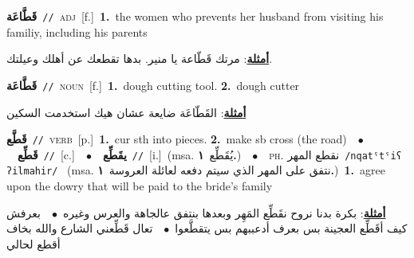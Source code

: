 \documentclass[10pt,a4paper,twoside]{article} %
\begin{document}
\begin{multicols}{2}
{\setlength\topsep{0pt}\textbf{\foreignlanguage{arabic}{قَطَّاعَة}}\ {\color{gray}\texttt{//}\color{black}}\ \textsc{adj}\ [f.]\ \textbf{1.}~the women who prevents her husband from visiting his familiy, including his parents\  \begin{flushright}\color{gray}\foreignlanguage{arabic}{\textbf{\underline{\foreignlanguage{arabic}{أمثلة}}}: مرتك قَطّاعة يا منير. بدها تقطعك عن أهلك وعيلتك.}\end{flushright}\color{black}} \vspace{2mm}

{\setlength\topsep{0pt}\textbf{\foreignlanguage{arabic}{قَطَّاعَة}}\ {\color{gray}\texttt{//}\color{black}}\ \textsc{noun}\ [f.]\ \textbf{1.}~dough cutting tool.  \textbf{2.}~dough cutter\  \begin{flushright}\color{gray}\foreignlanguage{arabic}{\textbf{\underline{\foreignlanguage{arabic}{أمثلة}}}: القَطّاعَة ضايعة عشان هيك استخدمت السكين}\end{flushright}\color{black}} \vspace{2mm}

{\setlength\topsep{0pt}\textbf{\foreignlanguage{arabic}{قَطَّع}}\ {\color{gray}\texttt{//}\color{black}}\ \textsc{verb}\ [p.]\ \textbf{1.}~cur sth into pieces.  \textbf{2.}~make sb cross (the road)\ \ $\bullet$\ \ \setlength\topsep{0pt}\textbf{\foreignlanguage{arabic}{قَطِّع}}\ {\color{gray}\texttt{//}\color{black}}\ [c.]\ \ $\bullet$\ \ \setlength\topsep{0pt}\textbf{\foreignlanguage{arabic}{يقَطِّع}}\ {\color{gray}\texttt{//}\color{black}}\ [i.]\ \color{gray}(msa. \foreignlanguage{arabic}{يُقَطِّع}~\foreignlanguage{arabic}{\textbf{١.}})\color{black}\ \ $\bullet$\ \ \textsc{ph.} \color{gray} \foreignlanguage{arabic}{نقطع المهر}\color{black}\ {\color{gray}\texttt{/{\sffamily nqatˤtˤiʕ ʔilmahir}/}\color{black}}\ \color{gray} (msa. \foreignlanguage{arabic}{نتفق على المهر الذي سيتم دفعه لعائلة العروسة}~\foreignlanguage{arabic}{\textbf{١.}})\color{black}\ \textbf{1.}~agree upon the dowry that will be paid to the bride's family\  \begin{flushright}\color{gray}\foreignlanguage{arabic}{\textbf{\underline{\foreignlanguage{arabic}{أمثلة}}}: بكرة بدنا نروح نقَطِّع المَهِر وبعدها بنتفق عالجاهة والعرس وغيره\ $\bullet$\ \  بعرفش كيف أقَطِّع العجينة بس بعرف أدعببهم بس يتقطَّعوا\ $\bullet$\ \  تعال قَطِّعني الشارع والله بخاف أقطع لحالي}\end{flushright}\color{black}} \vspace{2mm}


\end{multicols}
\end{document}
